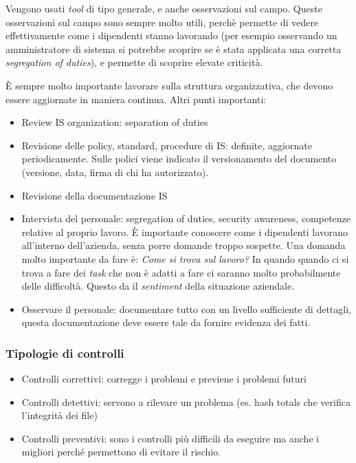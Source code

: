 Vengono usati \textit{tool} di tipo generale, e anche osservazioni sul campo. 
Queste osservazioni sul campo sono sempre molto utili, perchè permette di vedere 
effettivamente come i dipendenti stanno lavorando (per esempio osservando un 
amministratore di sistema si potrebbe scoprire se è stata applicata una corretta 
\textit{segregation of duties}), e permette di scoprire elevate criticità.


È sempre molto importante lavorare sulla struttura organizzativa, che devono 
essere aggiornate in maniera continua.
Altri punti importanti:
\begin{itemize}
\item Review IS organization: separation of duties
\item Revisione delle policy, standard, procedure di IS: definite, aggiornate 
periodicamente. Sulle polici viene indicato il versionamento del documento 
(versione, data, firma di chi ha autorizzato).
\item Revisione della documentazione IS
\item Intervista del personale: segregation of duties, security awareness, 
competenze relative al proprio lavoro. È importante conoscere come i dipendenti 
lavorano all'interno dell'azienda, senza porre domande troppo sospette. Una 
domanda molto importante da fare è: \textit{Come si trova sul lavoro?} In quando 
quando ci si trova a fare dei \textit{task} che non è adatti a fare ci saranno 
molto probabilmente delle difficoltà. Questo da il \textit{sentiment} della 
situazione aziendale.
\item Osservare il personale: documentare tutto 
con un livello sufficiente di dettagli, questa documentazione deve essere tale 
da fornire evidenza dei fatti.

\end{itemize}


\subsubsection{Tipologie di controlli}


\begin{itemize}
\item Controlli correttivi: corregge i problemi e previene i problemi futuri
\item Controlli detettivi: servono a rilevare un problema (es. hash totals che 
verifica l'integrità dei file)
\item Controlli preventivi: sono i controlli più difficili da eseguire ma anche 
i migliori perché permettono di evitare il rischio.
\end{itemize}

